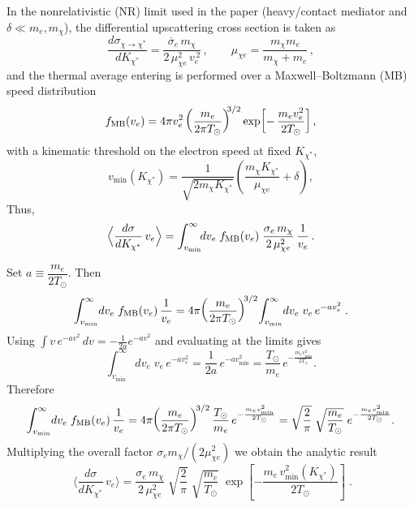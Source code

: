 \documentclass[13.1pt, letterpaper, twoside]{article}
\begin{document}
\smallskip
\noindent
In the nonrelativistic (NR) limit used in the paper (heavy/contact mediator and \(\delta\ll m_e,m_\chi\)), the differential upscattering cross section is taken as
\[
\;
\frac{d\sigma_{\chi\to\chi^\ast}}{dK_{\chi^\ast}}
=\frac{\overline{\sigma}_e\,m_\chi}{2\,\mu_{\chi e}^2\,v_e^{\,2}}\,,\qquad
\mu_{\chi e}=\frac{m_\chi m_e}{m_\chi+m_e}\,,
\;
\]
and the thermal average entering is performed over a Maxwell--Boltzmann (MB) speed distribution
\[
\;
f_{\rm MB}(v_e)=4\pi v_e^2\left(\frac{m_e}{2\pi T_\odot}\right)^{\!\!3/2}
\exp\!\left[-\,\frac{m_e v_e^2}{2T_\odot}\right],
\;
\]
with a kinematic threshold on the electron speed at fixed \(K_{\chi^\ast}\),
\[
\;
v_{\min}(K_{\chi^\ast})=
\frac{1}{\sqrt{2m_\chi K_{\chi^\ast}}}\left(\frac{m_\chi K_{\chi^\ast}}{\mu_{\chi e}}+\delta\right),
\;
\]
Thus,
\[
\;
\Big\langle \frac{d\sigma}{dK_{\chi^\ast}}\,v_e\Big\rangle
=\int_{v_{\min}}^{\infty}\!\!dv_e\; f_{\rm MB}(v_e)\;
\frac{\sigma_e\,m_\chi}{2\,\mu_{\chi e}^2}\,\frac{1}{v_e}\,.
\;
\]

\noindent
Set \(a \equiv \dfrac{m_e}{2T_\odot}\).
Then
\[
\int_{v_{\min}}^{\infty}\!dv_e\;f_{\rm MB}(v_e)\,\frac{1}{v_e}
=4\pi\!\left(\frac{m_e}{2\pi T_\odot}\right)^{\!3/2}\!
\int_{v_{\min}}^{\infty}\!dv_e\; v_e\,e^{-a v_e^2}\; .
\]
Using \(\displaystyle \int v\,e^{-a v^2}\,dv = -\frac{1}{2a}e^{-a v^2}\) and
evaluating at the limits gives
\[
\int_{v_{\min}}^{\infty}\!dv_e\; v_e\,e^{-a v_e^2}
=\frac{1}{2a}\,e^{-a v_{\min}^2}
=\frac{T_\odot}{m_e}\,e^{-\frac{m_e v_{\min}^2}{2T_\odot}}.
\]
Therefore
\[
\int_{v_{\min}}^{\infty}\!dv_e\;f_{\rm MB}(v_e)\,\frac{1}{v_e}
=4\pi\!\left(\frac{m_e}{2\pi T_\odot}\right)^{\!3/2}
\frac{T_\odot}{m_e}\,e^{-\frac{m_e v_{\min}^2}{2T_\odot}}
=\sqrt{\frac{2}{\pi}}\;\sqrt{\frac{m_e}{T_\odot}}\;
e^{-\frac{m_e v_{\min}^2}{2T_\odot}} .
\]
Multiplying the overall factor \(\sigma_e m_\chi/(2\mu_{\chi e}^2)\) we obtain the analytic result
\begin{equation}
    \boxed{\;
    \Big\langle \frac{d\sigma}{dK_{\chi^\ast}}\,v_e \Big\rangle
    =\frac{\sigma_e\,m_\chi}{2\,\mu_{\chi e}^2}\;
    \sqrt{\frac{2}{\pi}}\;\sqrt{\frac{m_e}{T_\odot}}\;
    \exp\!\left[-\frac{m_e\,v_{\min}^2(K_{\chi^\ast})}{2T_\odot}\right]}\; .
    \label{avgdiffcrosssection}
\end{equation}
\end{document}

